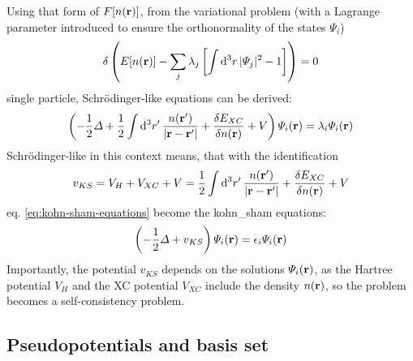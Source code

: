 \documentclass[main.tex]{subfiles}
\begin{document}
Using that form of \(F[n(\vb{r})]\), from the variational problem (with a Lagrange parameter introduced to ensure the orthonormality of the states \(\Psi_i\))
\begin{align}
     \delta \left( E [n(\vb{r})] - \sum_j \lambda_j \left[\int \dd[3]{r} \vert \Psi_j \vert^2 - 1 \right] \right) = 0
\end{align}
single particle, Schrödinger-like equations can be derived:
\begin{equation}\label{eq:kohn-sham-equations}
    \left(-\frac{1}{2} \Delta + \frac{1}{2} \int \dd[3]{r^{\prime}} \frac{n(\vb{r}^{\prime})}{\vert \vb{r} - \vb{r}^{\prime} \vert} + \fdv{E_{XC}}{n(\vb{r})} + V\right) \Psi_i (\vb{r}) = \lambda_i \Psi_i (\vb{r})
\end{equation}
Schrödinger-like in this context means, that with the identification
\begin{equation}
    v_{KS} = V_H + V_{XC} + V = \frac{1}{2} \int \dd[3]{r^{\prime}} \frac{n(\vb{r}^{\prime})}{\vert \vb{r} - \vb{r}^{\prime} \vert} + \fdv{E_{XC}}{n(\vb{r})} + V
\end{equation}
eq. \ref{eq:kohn-sham-equations} become the \acrshort{kohn_sham} equations:
\begin{equation}
    \left(- \frac{1}{2} \Delta + v_{KS}\right) \Psi_i (\vb{r}) = \epsilon_i \Psi_i (\vb{r})
\end{equation}
Importantly, the potential \(v_{KS}\) depends on the solutions \(\Psi_i (\vb{r})\), as the Hartree potential \(V_H\) and the XC potential \(V_{XC}\) include the density \(n(\vb{r})\), so the problem becomes a self-consistency problem.


\subsection{Pseudopotentials and basis set}
\end{document}
